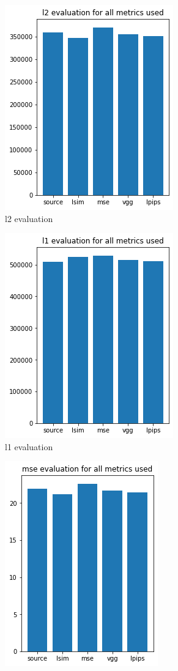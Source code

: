 \documentclass[a4paper,12pt,twoside]{report}
\begin{document}
\begin{figure}
\centering
\begin{subfigure}{0.49\textwidth}
  \centering
  \includegraphics[scale=0.4]{buoyancy/l2.png}
  \caption{l2 evaluation}
\end{subfigure}
\begin{subfigure}{0.49\textwidth}
  \centering
  \includegraphics[scale=0.4]{buoyancy/l1.png}
  \caption{l1 evaluation}
\end{subfigure}
\begin{subfigure}{0.49\textwidth}
  \centering
  \includegraphics[scale=0.4]{buoyancy/mse.png}

\end{subfigure}
\end{figure}
\end{document}
